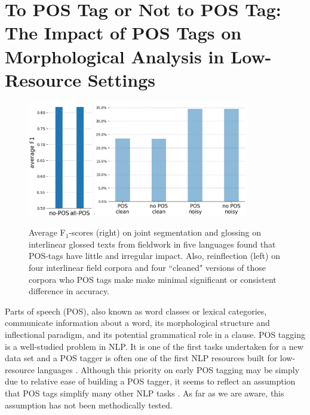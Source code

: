 \chapter{To POS Tag or Not to POS Tag: The Impact of POS Tags on Morphological Analysis in Low-Resource Settings}
\label{chap:POS}
  

\begin{figure}[htb]
    \centering
    \includegraphics[height=5cm]{figs/POS-avgSegGlossCropped.jpg}
    \hspace{3cm}
    \includegraphics[height=5cm]{figs/POS-avgReinfl.jpg}
    \caption[Comparison of Morphological Tasks with/out POS tags]{Average  F$_1$-scores (right) on joint segmentation and glossing on interlinear glossed texts from fieldwork in five languages found that POS-tags have little and irregular impact. Also, reinflection (left) on four interlinear field corpora and four ``cleaned" versions of those corpora who POS tags make make minimal significant or consistent difference in accuracy.}
    \label{fig:avgseggls}
\end{figure}


Parts of speech (POS), also known as word classes or lexical categories, communicate information about a word, its morphological structure and inflectional paradigm, and its potential grammatical role in a clause. 
POS tagging is a well-studied problem in NLP. It is one of the first tasks undertaken for a new data set and a POS tagger is often one of the first NLP resources built for low-resource languages
\citep{yarowsky_inducing_2001,cox_probabilistic_2010,de_pauw_resource-light_2012,baldridge_learning_2013,duong_natural_2017,anastasopoulos_computational_2019,millour_unsupervised_2019,eskander_unsupervised_2020}. Although this priority on early POS tagging may be simply due to relative ease of building a POS tagger, it seems to reflect an assumption that POS tags simplify many other NLP tasks \citep{krauwer_basic_2003}. 
As far as we are aware, this assumption has not been methodically tested. 

